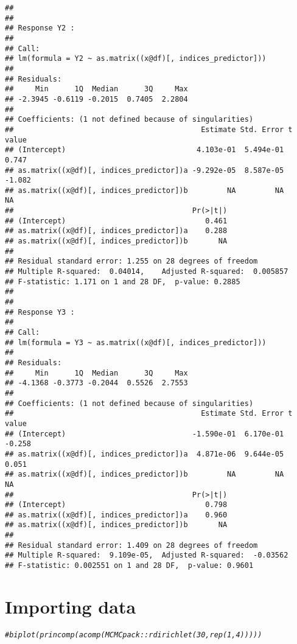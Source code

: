 \documentclass{article}\usepackage[]{graphicx}\usepackage[]{color}
\makeatletter
\newcommand{\hlcom}[1]{\textcolor[rgb]{0.678,0.584,0.686}{\textit{#1}}}%
\newenvironment{kframe}{%
 \def\at@end@of@kframe{}%
 \ifinner\ifhmode%
  \def\at@end@of@kframe{\end{minipage}}%
  \begin{minipage}{\columnwidth}%
 \fi\fi%
 \def\FrameCommand##1{\hskip\@totalleftmargin \hskip-\fboxsep
 \colorbox{shadecolor}{##1}\hskip-\fboxsep
     \hskip-\linewidth \hskip-\@totalleftmargin \hskip\columnwidth}%
 \MakeFramed {\advance\hsize-\width
   \@totalleftmargin\z@ \linewidth\hsize
   \@setminipage}}%
 {\par\unskip\endMakeFramed%
 \at@end@of@kframe}
\newenvironment{knitrout}{}{} %
\makeatother
\begin{document}
\begin{knitrout}
\begin{kframe}
\begin{verbatim}
## 
## 
## Response Y2 :
## 
## Call:
## lm(formula = Y2 ~ as.matrix((x@df)[, indices_predictor]))
## 
## Residuals:
##     Min      1Q  Median      3Q     Max 
## -2.3945 -0.6119 -0.2015  0.7405  2.2804 
## 
## Coefficients: (1 not defined because of singularities)
##                                           Estimate Std. Error t value
## (Intercept)                              4.103e-01  5.494e-01   0.747
## as.matrix((x@df)[, indices_predictor])a -9.292e-05  8.587e-05  -1.082
## as.matrix((x@df)[, indices_predictor])b         NA         NA      NA
##                                         Pr(>|t|)
## (Intercept)                                0.461
## as.matrix((x@df)[, indices_predictor])a    0.288
## as.matrix((x@df)[, indices_predictor])b       NA
## 
## Residual standard error: 1.255 on 28 degrees of freedom
## Multiple R-squared:  0.04014,	Adjusted R-squared:  0.005857 
## F-statistic: 1.171 on 1 and 28 DF,  p-value: 0.2885
## 
## 
## Response Y3 :
## 
## Call:
## lm(formula = Y3 ~ as.matrix((x@df)[, indices_predictor]))
## 
## Residuals:
##     Min      1Q  Median      3Q     Max 
## -4.1368 -0.3773 -0.2044  0.5526  2.7553 
## 
## Coefficients: (1 not defined because of singularities)
##                                           Estimate Std. Error t value
## (Intercept)                             -1.590e-01  6.170e-01  -0.258
## as.matrix((x@df)[, indices_predictor])a  4.871e-06  9.644e-05   0.051
## as.matrix((x@df)[, indices_predictor])b         NA         NA      NA
##                                         Pr(>|t|)
## (Intercept)                                0.798
## as.matrix((x@df)[, indices_predictor])a    0.960
## as.matrix((x@df)[, indices_predictor])b       NA
## 
## Residual standard error: 1.409 on 28 degrees of freedom
## Multiple R-squared:  9.109e-05,	Adjusted R-squared:  -0.03562 
## F-statistic: 0.002551 on 1 and 28 DF,  p-value: 0.9601
\end{verbatim}
\end{kframe}
\end{knitrout}

\section{Importing data}
\begin{knitrout}
\color{fgcolor}\begin{kframe}
\begin{alltt}
\hlcom{#biplot(princomp(acomp(MCMCpack::rdirichlet(30, rep(1, 4)))))}
\end{alltt}
\end{kframe}
\end{knitrout}
\end{document}
